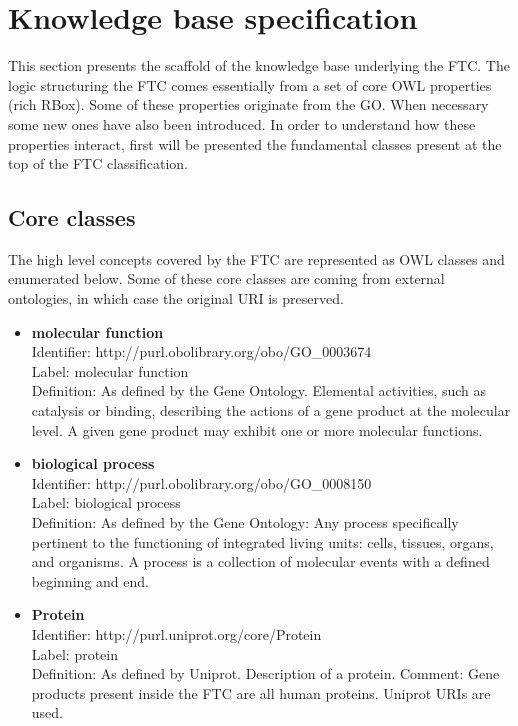 \documentclass{bioinfo}
\begin{document}
\section{Knowledge base specification}
This section presents the scaffold of the knowledge base underlying the FTC. 
The logic structuring the FTC comes essentially from a set of core OWL properties (rich RBox). 
Some of these properties originate from the GO. When necessary some new ones have also been introduced. 
In order to understand how these properties interact, first will be presented the fundamental classes present 
at the top of the FTC classification.

\subsection{Core classes}
The high level concepts covered by the FTC are represented as OWL classes and enumerated below. 
Some of these core classes are coming from external ontologies, in which case the original URI is preserved.


\begin{itemize}
\item \textbf{molecular function} \\
Identifier: http://purl.obolibrary.org/obo/GO\_0003674 \\
Label: molecular function \\
Definition: As defined by the Gene Ontology. Elemental activities, such as catalysis or binding, describing 
the actions of a gene product at the molecular level. A given gene product may exhibit one or more molecular functions.
\end{itemize}

\begin{itemize}
\item \textbf{biological process} \\
Identifier: http://purl.obolibrary.org/obo/GO\_0008150 \\
Label: biological process \\
Definition: As defined by the Gene Ontology: Any process specifically pertinent to the functioning of 
integrated living units: cells, tissues, organs, and organisms. A process is a collection of molecular 
events with a defined beginning and end.
\end{itemize}

\begin{itemize}
\item \textbf{Protein} \\
Identifier: http://purl.uniprot.org/core/Protein \\
Label: protein \\
Definition: As defined by Uniprot. Description of a protein.
Comment: Gene products present inside the FTC are all human proteins. Uniprot URIs are used.
\end{itemize}
\end{document}
